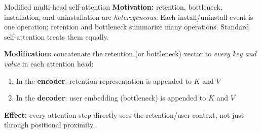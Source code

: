 \documentclass[aspectratio=169,t]{beamer}
\begin{document}
\begin{frame}{Modified multi-head self-attention}
  \textbf{Motivation:} retention, bottleneck, installation, and uninstallation are \emph{heterogeneous}. Each install/uninstall event is one operation; retention and bottleneck summarize many operations. Standard self-attention treats them equally.
  \vspace{0.3cm}

  \textbf{Modification:} concatenate the retention (or bottleneck) vector to \emph{every key and value} in each attention head:
      \vspace{0.15cm}
      \begin{enumerate}
        \item In the \textbf{encoder}: retention representation is appended to $K$ and $V$
        \item In the \textbf{decoder}: user embedding (bottleneck) is appended to $K$ and $V$
      \end{enumerate}
      \vspace{0.2cm}
  \textbf{Effect:} every attention step directly sees the retention/user context, not just through positional proximity.
\end{frame}
\end{document}
